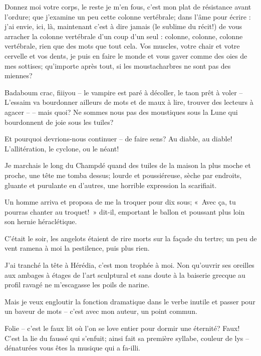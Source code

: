   Donnez  moi  votre  corps,  le  reste   je  m’en  fous,  c’est  mon  plat
  de  résistance  avant  l’ordure;  que j’examine  un  peu  cette  colonne
  vertébrale;   dans  l’âme  pour
  écrire  : j’ai  envie, ici,  là, maintenant  c’est à  dire jamais  (le
  sublime  du récit!)  de vous  arracher  la colonne  vertébrale d’un  coup
  d’un seul  : colonne, colonne, colonne  vertébrale, rien que des  mots que
  tout cela. Vos muscles,  votre chair et votre cervelle et  vos dents, je puis
  en faire le monde et vous gaver  comme des oies de mes sottises; qu’importe
  après tout, si les moustacharbres ne sont pas des miennes?

  Badaboum crac, fiiiyou -- le vampire est paré à décoller, le taon prêt à
  voler  --    L’essaim  va
  bourdonner  ailleurs de  mots et  de maux  à lire,  trouver des  lecteurs à
  agacer --    -- mais quoi?  Ne sommes nous  pas des
  moustiques  sous  la  Lune  qui  bourdonnent de  joie  sous  les  tuiles?

  Et pourquoi devrions-nous  continuer -- de faire sens? Au  diable, au diable!
  L’allitération, le cyclone, ou le néant!

  Je marchais le long  du Champdé quand des tuiles de la  maison la plus moche
  et proche,  une tête me  tomba dessus;  lourde et poussiéreuse,  sèche par
  endroits,  gluante et  purulante en  d’autres, une  horrible expression  la
  scarifiait.

  Un homme arriva  et proposa de me  la troquer pour dix sous;  «~Avec ça, tu
  pourras chanter au  troquet!~» dit-il, emportant le ballon  et poussant plus
  loin son hernie héraclétique.

  C’était le  soir, les angelots  étaient de rire  morts sur la  façade du
  tertre; un peu de vent ramena à moi la pestilence, puis plus rien.

  J’ai  tranché la  tête à  Hérédia, c’est  mon trophée  à moi.  Non
  qu’ouvrir ses oreilles aux ambages à étages de l’art sculptural et sans
  doute à la baiserie grecque au  profil ravagé ne m’escagasse les poils de
  narine.

  Mais je veux engloutir la fonction dramatique dans le verbe inutile et passer
  pour un baveur de mots -- c’est avec mon auteur, un point commun.

  Folie  -- c’est  le faux  lit où  l’on se  love entier  pour dormir  une
  éternité? Faux!  C’est la lie  du faussé  qui s’enfuit; ainsi  fait sa
  première syllabe, couleur de lys -- dénaturées vous êtes la musique qui a
  fa-illi.

